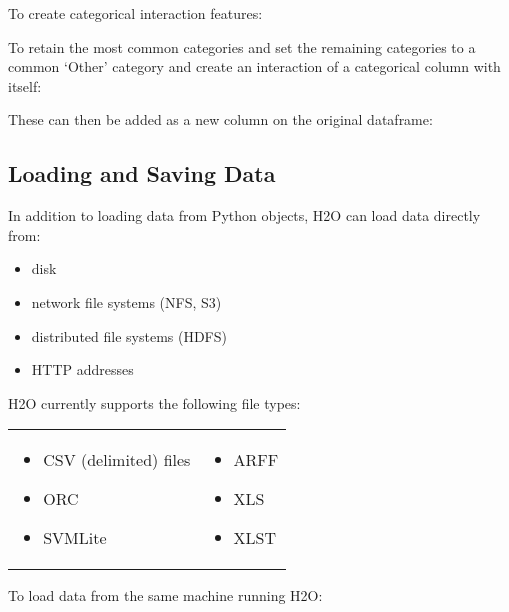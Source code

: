 {To create categorical interaction features:


To retain the most common categories and set the remaining categories to a common `Other' category
 and create an interaction of a categorical column with itself:



These can then be added as a new column on the original dataframe:


\subsection{Loading and Saving Data}
In addition to loading data from Python objects, H2O can load data directly from:
\begin{itemize}
\item disk
\item network file systems (NFS, S3)
\item distributed file systems (HDFS)
\item HTTP addresses
\end{itemize}

 H2O currently supports the following file types:

\begin{frame}%

\begin{tabular}{p{5.5cm}p{5.5cm}}

\begin{itemize}
\item CSV (delimited) files
\item ORC
\item SVMLite
\end{itemize} &
\begin{itemize}
\item ARFF
\item XLS
\item XLST 
\end{itemize}
\end{tabular}
\end{frame}

To load data from the same machine running H2O:


}
